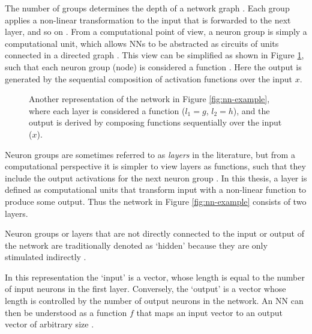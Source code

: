\documentclass[report.tex]{subfiles}
\begin{document}
The number of groups determines the depth of
a network graph \cite{Russel2007}.
Each group applies a non-linear transformation to the input that is forwarded
to the next layer, and so on \cite{Bishop2006, Russel2007}.
From a computational point of view, a neuron group is simply a computational
unit, which allows \glspl{NN} to be abstracted as circuits of units connected in
a directed graph
\cite{Dayan2001, Eliasmith2004, Russel2007}.
This view can be simplified as shown in Figure \ref{fig:nn-composition},
such that each neuron group (node)
is considered a function \cite{Rojas1996}.
Here the output is generated by the sequential
composition of activation functions over the input $x$.
\begin{figure}
\centering
{}
\caption{Another representation of the network in Figure
  \ref{fig:nn-example}, where each layer is considered a function ($l_1 = g$, $l_2 = h$),
and the output is derived by composing functions sequentially 
over the input ($x$).}
\label{fig:nn-composition}
\end{figure}

Neuron groups are sometimes referred to as \textit{layers} 
in the literature, but from a computational perspective it is simpler to view layers as
functions, such that they include the output activations for the next neuron group \cite{Bishop2006}.
In this thesis, a layer is defined as computational units that transform input
with a non-linear function to produce some output.
Thus the network in Figure \ref{fig:nn-example} consists of two layers.

Neuron groups or layers that are not directly connected to the input or output
of the network are traditionally denoted as `hidden' because they are only
stimulated indirectly \cite{Russel2007}.

In this representation the `input' is a vector, whose
length is equal to the number of input neurons in the first layer.
Conversely, the `output' is a vector whose length
is controlled by the number of output neurons in the network.
An \gls{NN} can then be understood as a function $f$ that 
maps an input vector to an output vector of arbitrary size
\cite{Russel2007}.
\end{document}
